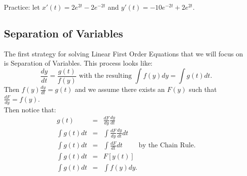 \documentclass[10pt]{article}
\begin{document}
    Practice: let $x'(t)=2e^{2t}-2e^{-2t}$ and $y'(t)=-10e^{-2t}+2e^{2t}$.
    
    \subsection{Separation of Variables}
        The first strategy for solving Linear First Order Equations that we will focus on is Separation of Variables. This process looks like: $$\frac{dy}{dt}=\frac{g(t)}{f(y)} \text{ with the resulting } \int{f(y)dy}=\int{g(t)dt}.$$
        Then $f(y)\frac{dy}{dt}=g(t)$ and we assume there exists an $F(y)$ such that $\frac{dF}{dy}=f(y)$.\\
        Then notice that:
        \begin{eqnarray*}
            g(t)        &=&\frac{dF}{dy}\frac{dy}{dt} \\
            \int{g(t)dt}&=&\int{\frac{dF}{dy}\frac{dy}{dt}dt}\\
            \int{g(t)dt}&=&\int{\frac{dF}{dt}dt}     \hspace{1cm}\text{by the Chain Rule.}\\
            \int{g(t)dt}&=&F[y(t)]\\
            \int{g(t)dt}&=&\int{f(y)dy}.
        \end{eqnarray*}
    
\end{document}
